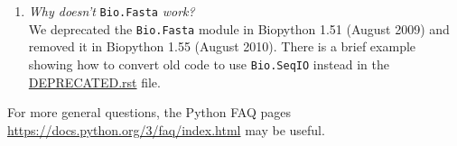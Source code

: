 \begin{enumerate}
  \item \emph{Why doesn't} \verb|Bio.Fasta| \emph{work?} \\
  We deprecated the \verb|Bio.Fasta| module in Biopython 1.51 (August 2009) and removed it in Biopython 1.55 (August 2010). There is a brief example showing how to convert old code to use \verb|Bio.SeqIO| instead in the \href{https://github.com/biopython/biopython/blob/master/DEPRECATED.rst}{DEPRECATED.rst} file.

\end{enumerate}

\noindent For more general questions, the Python FAQ pages \url{https://docs.python.org/3/faq/index.html} may be useful.
